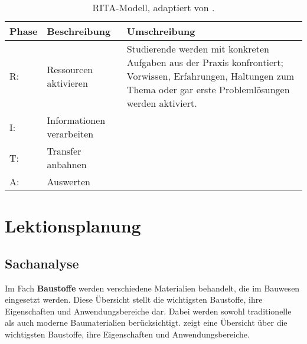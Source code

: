 \documentclass[
11pt,
captions=tableheading,
smallheadings,
headsepline,
footsepline, 
captions=tableheading,
parskip=half-,
]{scrartcl}
\begin{document}
\begin{table}[H]
    \centering
    \label{tab:RITA_Modell}
    \caption{RITA-Modell, adaptiert von \cite{BerufspädagogischesKonzept_BauschuleAarau}.}
    \begin{tabularx}{\textwidth}{@{}llp{9.5cm}@{}}
        \toprule
        \textbf{Phase} & \textbf{Beschreibung}     & \textbf{Umschreibung}                                                                                                                                               \\
        \midrule
        R:             & Ressourcen aktivieren     & Studierende werden mit konkreten Aufgaben aus der Praxis konfrontiert; Vorwissen, Erfahrungen, Haltungen zum Thema oder gar erste Problemlösungen werden aktiviert. \\
        I:             & Informationen verarbeiten & {}                                                                                                                                                                  \\
        T:             & Transfer anbahnen         & {}                                                                                                                                                                  \\
        A:             & Auswerten                 & {}                                                                                                                                                                  \\
        \bottomrule
    \end{tabularx}
\end{table}


\clearpage


\section{Lektionsplanung}
\subsection{Sachanalyse}
Im Fach \textbf{Baustoffe} werden verschiedene Materialien behandelt, die im Bauwesen eingesetzt werden. Diese Übersicht stellt die wichtigsten Baustoffe, ihre Eigenschaften und Anwendungsbereiche dar. Dabei werden sowohl traditionelle als auch moderne Baumaterialien berücksichtigt.
 zeigt eine Übersicht über die wichtigsten Baustoffe, ihre Eigenschaften und Anwendungsbereiche.
\end{document}
